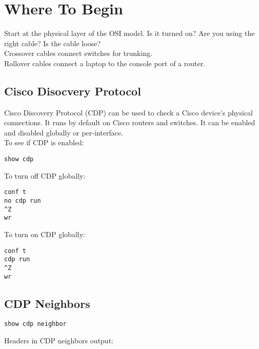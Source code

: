 \documentclass{article}
\begin{document}
\section{Where To Begin}

Start at the physical layer of the OSI model. Is it turned on? Are you using
the right cable? Is the cable loose?\\

Crossover cables connect switches for trunking.\\

Rollover cables connect a laptop to the console port of a router.

\subsection{Cisco Disocvery Protocol}

Cisco Discovery Protocol (CDP) can be used to check a Cisco device's physical
connections. It runs by default on Cisco routers and switches. It can be
enabled and disabled globally or per-interface.\\

To see if CDP is enabled:

\begin{verbatim}
show cdp
\end{verbatim}

To turn off CDP globally:

\begin{verbatim}
conf t
no cdp run
^Z
wr
\end{verbatim}

To turn on CDP globally:

\begin{verbatim}
conf t
cdp run
^Z
wr
\end{verbatim}

\subsection{CDP Neighbors}

\begin{verbatim}
show cdp neighbor
\end{verbatim}

Headers in CDP neighbors output:
\end{document}

